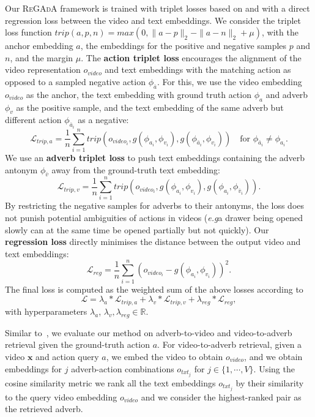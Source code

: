 \documentclass[table]{bmvc2k}
\def\eg{\emph{e.g}\bmvaOneDot}
\newcommand{\modelName}{\textsc{ReGAdA}\xspace}
\begin{document}
Our \modelName framework is trained with triplet losses based on \cite{doughty_action_2020} and with a direct regression loss between the video and text embeddings. 
We consider the triplet loss function $trip(a, p, n) = max(0, \|a - p\|_2 - \|a - n\|_2 +\mu)$, with the anchor embedding $a$, the embeddings for the positive and negative samples $p$ and $n$, and the margin $\mu$.
The \textbf{action triplet loss} encourages the alignment of the video representation $o_{video}$ and text embeddings with the matching action as opposed to a sampled negative action $\phi_{\bar{a}}$. For this, we use the video embedding $o_{{video}}$ as the anchor, the text embedding with ground truth action $\phi_{a}$ and adverb $\phi_{v}$ as the positive sample, and the text embedding of the same adverb but different action $\phi_{\bar{a}_i}$ as a negative:
\begin{equation}  
\mathcal{L}_{trip,a} = \frac{1}{n} \sum_{i=1}^{n} trip(o_{{video}_i},g(\phi_{a_i}, \phi_{v_i}),g(\phi_{\bar{a}_i}, \phi_{v_i})) \quad\text{for } \phi_{\bar{a}_i} \neq \phi_{a_i}.
\end{equation}
We use an \textbf{adverb triplet loss} to push text embeddings containing the adverb antonym $\phi_{\bar{v}}$ away from the ground-truth text embedding:
\begin{equation}
    \mathcal{L}_{trip,v} = \frac{1}{n} \sum_{i=1}^{n} trip(o_{{video}_i},g(\phi_{a_i}, \phi_{v_i}), g(\phi_{a_i}, \phi_{\bar{v}_i})).
\end{equation}
By restricting the negative samples for adverbs to their antonyms, the loss does not punish potential ambiguities of actions in videos (\eg a drawer being opened slowly can at the same time be opened partially but not quickly). 
Our \textbf{regression loss} directly minimises the distance between the output video and text embeddings: 
\begin{equation}
    \mathcal{L}_{reg} = \frac{1}{n} \sum_{i=1}^{n} (o_{{video}_i} - g(\phi_{a_i},\phi_{v_i}))^2.
\end{equation}
The final loss is computed as the weighted sum of the above losses according to
\begin{equation}
    \mathcal{L} = \lambda_{a} * \mathcal{L}_{trip,a} + \lambda_{v} * \mathcal{L}_{trip,v} + \lambda_{reg} * \mathcal{L}_{reg}, 
\end{equation}
with hyperparameters $\lambda_{a}$, $\lambda_{v}, \lambda_{reg} \in \mathbb{R}$.

Similar to~\cite{doughty_action_2020}, we evaluate our method on adverb-to-video and video-to-adverb retrieval given the ground-truth action $a$. For video-to-adverb retrieval, given a video $\bm x$ and action query $a$, we embed the video to obtain $o_{video}$, and we obtain embeddings for $j$ adverb-action combinations $o_{txt_j}$ for $j \in \{1,\cdots, V\}$. Using the cosine similarity metric we rank all the text embeddings $o_{txt_j}$ by their similarity to the query video embedding $o_{video}$ and we consider the highest-ranked pair as the retrieved adverb. 
\end{document}
